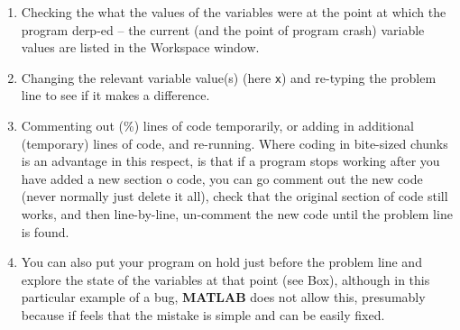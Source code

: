 \documentclass{tufte-book} %
\begin{document}
\begin{enumerate}[noitemsep]
\setlength{\itemindent}{.2in}
\item Checking the what the values of the variables were at the point at which the program derp-ed -- the current (and the point of program crash) variable values are listed in the \textsf{Workspace window}.
\item Changing the relevant variable value(s) (here \texttt{x}) and re-typing the problem line to see if it makes a difference.
\item Commenting out (\textcolor[rgb]{0,0.501961,0}{\%}) lines of code temporarily, or adding in additional (temporary) lines of code, and re-running. Where coding in bite-sized chunks is an advantage in this respect, is that if a program stops working after you have added a new section o code, you can go comment out the new code (never normally just delete it all), check that the original section of code still works, and then line-by-line, un-comment the new code until the problem line is found.   
\item You can also put your program on hold just before the problem line and explore the state of the variables at that point (see Box), although in this particular example of a bug, \textbf{MATLAB} does not allow this, presumably because if feels that the mistake is simple and can be easily fixed. 
\end{enumerate}

\end{document}
